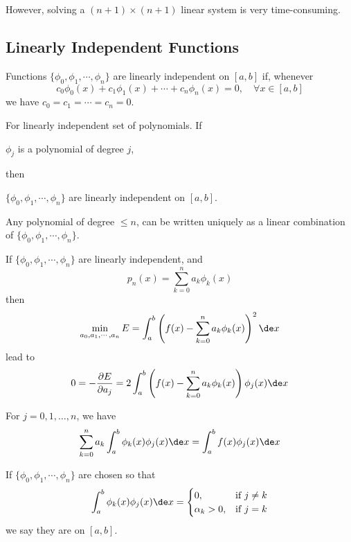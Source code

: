 However, solving a $(n+1) \times (n+1)$ linear system is very time-consuming.

\subsection{Linearly Independent Functions}

\begin{definition}
    Functions $\{\phi_0, \phi_1, \cdots, \phi_n\}$ are linearly independent on $[a,b]$ if, whenever \[
        c_0 \phi_0(x) + c_1 \phi_1(x) + \cdots + c_n \phi_n(x) = 0, \quad \forall x \in [a,b]
    \]
    we have $c_0 = c_1 = \cdots = c_n = 0$.
\end{definition}

\begin{theorem}
    For linearly independent set of polynomials. If \begin{center}
        $\phi_j$ is a polynomial of degree $j$,
    \end{center}
    then \begin{center}
        $\{\phi_0, \phi_1, \cdots, \phi_n\}$ are linearly independent on $[a,b]$.
    \end{center}
\end{theorem}

\begin{proposition}
    Any polynomial of degree $\leq n$, can be written uniquely as a linear combination of $\{\phi_0, \phi_1, \cdots, \phi_n\}$.
\end{proposition}

If $\{\phi_0, \phi_1, \cdots, \phi_n\}$ are linearly independent, and \[
    p_n(x) = \sum_{k=0}^n a_k \phi_k(x)
\]
then \[
    \min_{a_0, a_1, \cdots, a_n} E = \int_a^b \left(f(x) - \sum_{k=0}^n a_k \phi_k(x)\right)^2 \de x
\]
lead to \[
    0 = - \frac{\partial E}{\partial a_j} = 2 \int_a^b \left(f(x) - \sum_{k=0}^n a_k \phi_k(x)\right) \phi_j(x) \de x
\]

For $j=0,1,\dots,n$, we have \begin{equation}
    \sum_{k=0}^n a_k \int_a^b \phi_k(x) \phi_j(x) \de x = \int_a^b f(x) \phi_j(x) \de x \label{eq:7.1}
\end{equation}

\begin{definition}
    If $\{\phi_0, \phi_1, \cdots, \phi_n\}$ are chosen so that \[
        \int_a^b \phi_k(x) \phi_j(x) \de x = \begin{cases}
            0, & \mbox{if } j \neq k\\
            \alpha_k > 0, & \mbox{if } j = k
        \end{cases}
    \]
    we say they are  on $[a,b]$.
\end{definition}

